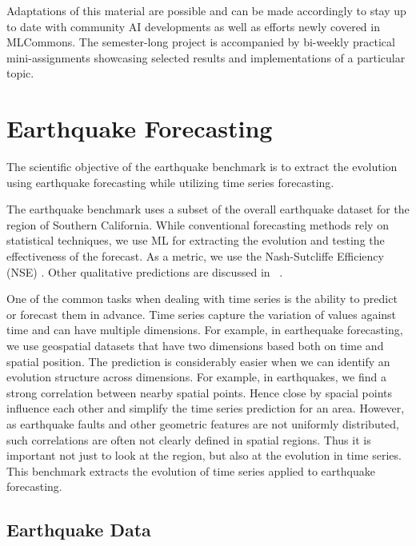 \documentclass[utf8]{FrontiersinVancouver} %
\begin{document}
 Adaptations of this material are possible and can be made accordingly
 to stay up to date with community AI developments as well as efforts
 newly covered in MLCommons. The semester-long project is accompanied
 by bi-weekly practical mini-assignments showcasing selected results
 and implementations of a particular topic.

\section{Earthquake Forecasting}
\label{sec:eq}

The scientific objective of the earthquake benchmark is to extract the
evolution using earthquake forecasting while utilizing time series forecasting.

The earthquake benchmark uses a subset of the overall earthquake
dataset for the region of Southern California. While conventional
forecasting methods rely on statistical techniques, we use ML
for extracting the evolution and testing the effectiveness of the
forecast.  As a metric, we use the Nash-Sutcliffe Efficiency (NSE)
\citep{nash-79}.  Other qualitative predictions are discussed in
~\citep{fox2022-jm}.

One of the common tasks when dealing with time series is the ability
to predict or forecast them in advance.  Time series capture the
variation of values against time and can have multiple dimensions. For
example, in earthequake forecasting, we use geospatial datasets that have
two dimensions based both on time and spatial position. The prediction
is considerably easier when we can identify an evolution structure
across dimensions. For example, in earthquakes, we find a strong
correlation between nearby spatial points. Hence close by spacial
points influence each other and simplify the time series prediction
for an area.  However, as earthquake faults and other geometric features
are not uniformly distributed, such correlations are often not clearly
defined in spatial regions. Thus it is important not just to look at
the region, but also at the evolution in time series. This benchmark
extracts the evolution of time series applied to earthquake forecasting.


\subsection{Earthquake Data}
\end{document}
